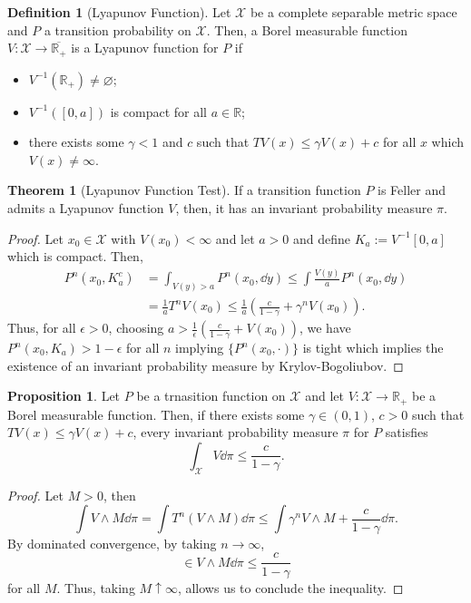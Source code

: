 \documentclass[]{article}
\theoremstyle{definition}
\newtheorem{theorem}{Theorem}
\theoremstyle{definition}
\newtheorem{definition}{Definition}[section]
\newtheorem{proposition}{Proposition}[section]
\begin{document}
\begin{definition}[Lyapunov Function]
  Let \(\mathcal{X}\) be a complete separable metric space and \(P\) a transition 
  probability on \(\mathcal{X}\). Then, a Borel measurable function 
  \(V : \mathcal{X} \to \overline{\mathbb{R}_+}\) is a Lyapunov function for 
  \(P\) if 
  \begin{itemize}
    \item \(V^{-1}(\mathbb{R}_+) \neq \varnothing\);
    \item \(V^{-1}([0, a])\) is compact for all \(a \in \mathbb{R}\);
    \item there exists some \(\gamma < 1\) and \(c\) such that 
    \(TV(x) \le \gamma V(x) + c\) for all \(x\) which \(V(x) \neq \infty\).
  \end{itemize}
\end{definition}

\begin{theorem}[Lyapunov Function Test]
  If a transition function \(P\) is Feller and admits a Lyapunov function \(V\),
  then, it has an invariant probability measure \(\pi\).
\end{theorem}
\begin{proof}
  Let \(x_0 \in \mathcal{X}\) with \(V(x_0) < \infty\) and let \(a > 0\) and 
  define \(K_a := V^{-1}[0, a]\) which is compact. Then, 
  \[\begin{split}
    P^n(x_0, K_a^c) & = \int_{V(y) > a} P^n(x_0, \dd y) \le \int \frac{V(y)}{a} P^n(x_0, \dd y)\\
    & = \frac{1}{a} T^n V(x_0) \le \frac{1}{a}\left(\frac{c}{1 - \gamma} + \gamma^n V(x_0)\right).
  \end{split}\]
  Thus, for all \(\epsilon > 0\), choosing \(a > \frac{1}{\epsilon}\left(\frac{c}{1 - \gamma} + V(x_0)\right)\),
  we have \(P^n(x_0, K_a) > 1 - \epsilon\) for all \(n\) implying \(\{P^n(x_0, \cdot)\}\) 
  is tight which implies the existence of an invariant probability measure 
  by Krylov-Bogoliubov.
\end{proof}

\begin{proposition}
  Let \(P\) be a trnasition function on \(\mathcal{X}\) and let \(V : \mathcal{X} \to \mathbb{R}_+\)
  be a Borel measurable function. Then, if there exists some \(\gamma \in (0, 1)\), 
  \(c > 0\) such that \(TV(x) \le \gamma V(x) + c\), every invariant probability 
  measure \(\pi\) for \(P\) satisfies 
  \[\int_{\mathcal{X}} V \dd \pi \le \frac{c}{1 - \gamma}.\]
\end{proposition}
\begin{proof}
  Let \(M > 0\), then 
  \[\int V \wedge M \dd \pi = \int T^n(V \wedge M) \dd \pi \le \int 
    \gamma^n  V \wedge M + \frac{c}{1 - \gamma} \dd \pi.\]
  By dominated convergence, by taking \(n \to \infty\),
  \[\in V \wedge M \dd \pi \le \frac{c}{1 - \gamma}\]
  for all \(M\). Thus, taking \(M \uparrow \infty\), allows us to conclude the 
  inequality.
\end{proof}
\end{document}
